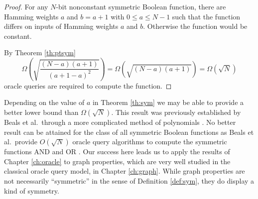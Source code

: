 \begin{proof}
For any $N$-bit nonconstant symmetric Boolean function, there are
Hamming weights $a$ and $b = a+1$ with $0 \le a \le N-1$ such that the
function differs on inputs of Hamming weights $a$ and $b$.  Otherwise
the function would be constant.

By Theorem \ref{th:ptsym}
\[\Omega\left(\sqrt{\frac{(N - a)(a+1)}{(a+1-a)^{2}}}\right) =
\Omega\left(\sqrt{\left(N-a\right)\left(a+1\right)}\right) = 
\Omega\left(\sqrt{N}\right)\]
oracle queries are required to compute the function.  
\end{proof}

Depending on the value of $a$ in Theorem \ref{th:sym} we may be able
to provide a better lower bound than $\Omega(\sqrt{N})$.  This result
was previously established by Beals et al.\ through a more complicated
method of polynomials \cite{beals98quantum}.  No better result can be
attained for the class of all symmetric Boolean functions as Beals et
al.\ provide $O(\sqrt{N})$ oracle query algorithms to compute the
symmetric functions AND and OR \cite{beals98quantum}.  Our success
here leads us to apply the results of Chapter \ref{ch:oracle} to graph
properties, which are very well studied in the classical oracle query
model, in Chapter \ref{ch:graph}.  While graph properties are not
necessarily ``symmetric'' in the sense of Definition \ref{def:sym},
they do display a kind of symmetry.

